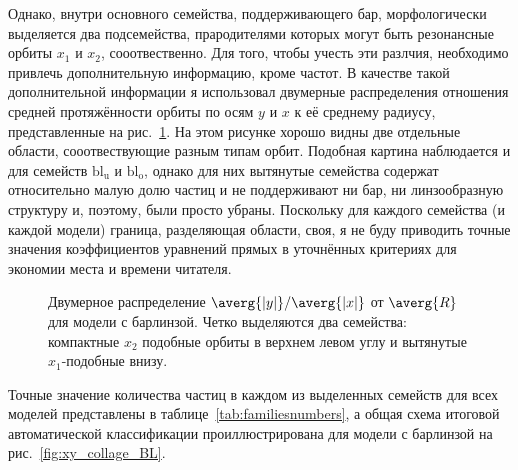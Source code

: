 \documentclass[tikz]{trlnotes}
\begin{document}
Однако, внутри основного семейства, поддерживающего бар, морфологически выделяется два подсемейства,
прародителями которых могут быть резонансные орбиты $x_1$ и $x_2$, сооотвественно. Для того, чтобы учесть
эти разлчия, необходимо привлечь дополнительную информацию, кроме частот.
В качестве такой дополнительной информации я использовал двумерные распределения отношения средней протяжённости
орбиты по осям $y$ и $x$ к её среднему радиусу, представленные на рис.~\ref{fig:x1x2sep}. На этом рисунке хорошо видны две отдельные области, сооотвествующие разным типам орбит. Подобная картина наблюдается и для семейств
$\text{bl}_\text{u}$ и $\text{bl}_\text{o}$, однако для них вытянутые семейства содержат относительно малую долю частиц и не поддерживают ни бар, ни линзообразную структуру и, поэтому, были просто убраны. 
Поскольку для каждого семейства (и каждой модели) граница, разделяющая области, своя, я не буду приводить точные значения коэффициентов уравнений прямых в
уточнённых критериях для экономии места и времени читателя.  

\begin{figure}[htpb]
  \centering
\caption{Двумерное распределение $\averg{|y|}/\averg{|x|}$ от $\averg{R}$ для модели с барлинзой. Четко выделяются
два семейства: компактные $x_2$ подобные орбиты в верхнем левом углу и вытянутые $x_1$-подобные внизу. }%
\label{fig:x1x2sep}
\end{figure}

Точные значение количества частиц в каждом из выделенных семейств для всех моделей представлены в таблице~\ref{tab:familiesnumbers},
а общая схема итоговой автоматической классификации проиллюстрирована для модели с барлинзой на рис.~\ref{fig:xy_collage_BL}.
\end{document}
